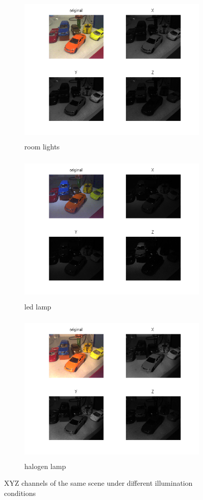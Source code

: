 \documentclass[
a4paper,     %
11pt         %
]{scrartcl}  %
\begin{document}
\newpage
\begin{figure}[ht!]
\centering
\begin{subfigure}{\textwidth}
  \centering
  \includegraphics[trim=60px 40px 60px 0, clip, height=7.3cm]{./Bildg_Messtechnik_Lab/ColorSpaces/html/main_04.png}
  \caption{room lights}
\end{subfigure}
\begin{subfigure}{\textwidth}
  \centering
  \includegraphics[trim=60px 40px 60px 0, clip, height=7.3cm]{./Bildg_Messtechnik_Lab/ColorSpaces/html/main_08.png}
  \caption{led lamp}
\end{subfigure}
\begin{subfigure}{\textwidth}
  \centering
  \includegraphics[trim=60px 40px 60px 0, clip, height=7.3cm]{./Bildg_Messtechnik_Lab/ColorSpaces/html/main_12.png}
  \caption{halogen lamp}
\end{subfigure}
\caption{XYZ channels of the same scene under different illumination conditions}
\label{fig:colSpa_XYZ}
\end{figure}
\end{document}

